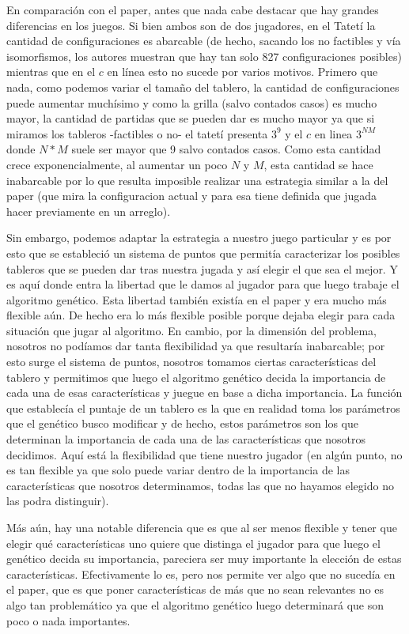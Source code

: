 \documentclass[A4paper,oneside,fleqn,11pt]{article}
\theoremstyle{definition}
\begin{document}
En comparación con el paper, antes que nada cabe destacar que hay grandes diferencias en los juegos. Si bien ambos son de dos jugadores, en el Tatetí la cantidad de configuraciones es abarcable (de hecho, sacando los no factibles y vía isomorfismos, los autores muestran que hay tan solo 827 configuraciones posibles) mientras que en el $c$ en línea esto no sucede por varios motivos. Primero que nada, como podemos variar el tamaño del tablero, la cantidad de configuraciones puede aumentar muchísimo y como la grilla (salvo contados casos) es mucho mayor, la cantidad de partidas que se pueden dar es mucho mayor ya que si miramos los tableros -factibles o no- el tatetí presenta $3^9$ y el $c$ en linea $3^{NM}$ donde $N*M$ suele ser mayor que 9 salvo contados casos. Como esta cantidad crece exponencialmente, al aumentar un poco $N$ y $M$, esta cantidad se hace inabarcable por lo que resulta imposible realizar una estrategia similar a la del paper (que mira la configuracion actual y para esa tiene definida que jugada hacer previamente en un arreglo).

Sin embargo, podemos adaptar la estrategia a nuestro juego particular y es por esto que se estableció un sistema de puntos que permitía caracterizar los posibles tableros que se pueden dar tras nuestra jugada y así elegir el que sea el mejor. Y es aquí donde entra la libertad que le damos al jugador para que luego trabaje el algoritmo genético. Esta libertad también existía en el paper y era mucho más flexible aún. De hecho era lo más flexible posible porque dejaba elegir para cada situación que jugar al algoritmo. En cambio, por la dimensión del problema, nosotros no podíamos dar tanta flexibilidad ya que resultaría inabarcable; por esto surge el sistema de puntos, nosotros tomamos ciertas características del tablero y permitimos que luego el algoritmo genético decida la importancia de cada una de esas características y juegue en base a dicha importancia. La función que establecía el puntaje de un tablero es la que en realidad toma los parámetros que el genético busco modificar y de hecho, estos parámetros son los que determinan la importancia de cada una de las características que nosotros decidimos. Aquí está la flexibilidad que tiene nuestro jugador (en algún punto, no es tan flexible ya que solo puede variar dentro de la importancia de las características que nosotros determinamos, todas las que no hayamos elegido no las podra distinguir).

Más aún, hay una notable diferencia que es que al ser menos flexible y tener que elegir qué características uno quiere que distinga el jugador para que luego el genético decida su importancia, pareciera ser muy importante la elección de estas características. Efectivamente lo es, pero nos permite ver algo que no sucedía en el paper, que es que poner características de más que no sean relevantes no es algo tan problemático ya que el algoritmo genético luego determinará que son poco o nada importantes. 
\end{document}
